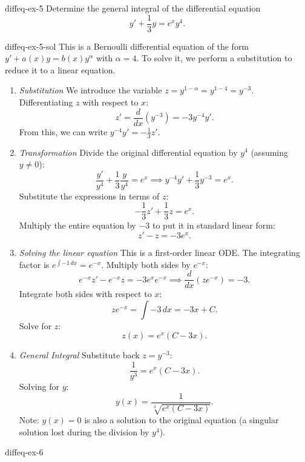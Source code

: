 \documentclass[preview]{standalone}
\begin{document}
\begin{snippetexercise}{diffeq-ex-5}{}
    Determine the general integral of the differential equation
    \[ y' + \frac{1}{3}y = e^x y^4. \]
\end{snippetexercise}

\begin{snippetsolution}{diffeq-ex-5-sol}{}
    This is a Bernoulli differential equation of the form \( y' + a(x)y = b(x)y^\alpha \) with \( \alpha = 4 \). To solve it, we perform a substitution to reduce it to a linear equation.
    \begin{enumerate}
        \item \emph{Substitution}
        We introduce the variable \( z = y^{1-\alpha} = y^{1-4} = y^{-3} \).
        Differentiating \( z \) with respect to \( x \):
        \[ z' = \frac{d}{dx}(y^{-3}) = -3y^{-4}y'. \]
        From this, we can write \( y^{-4}y' = -\frac{1}{3}z' \).
        \item \emph{Transformation}
        Divide the original differential equation by \( y^4 \) (assuming \( y \neq 0 \)):
        \[ \frac{y'}{y^4} + \frac{1}{3}\frac{y}{y^4} = e^x \implies y^{-4}y' + \frac{1}{3}y^{-3} = e^x. \]
        Substitute the expressions in terms of \( z \):
        \[ -\frac{1}{3}z' + \frac{1}{3}z = e^x. \]
        Multiply the entire equation by \( -3 \) to put it in standard linear form:
        \[ z' - z = -3e^x. \]
        \item \emph{Solving the linear equation}
        This is a first-order linear ODE. The integrating factor is \( e^{\int -1 \, dx} = e^{-x} \).
        Multiply both sides by \( e^{-x} \):
        \[ e^{-x}z' - e^{-x}z = -3e^x e^{-x} \implies \frac{d}{dx}(z e^{-x}) = -3. \]
        Integrate both sides with respect to \( x \):
        \[ z e^{-x} = \int -3 \, dx = -3x + C. \]
        Solve for \( z \):
        \[ z(x) = e^x(C - 3x). \]
        \item \emph{General Integral}
        Substitute back \( z = y^{-3} \):
        \[ \frac{1}{y^3} = e^x(C - 3x). \]
        Solving for \( y \):
        \[ y(x) = \frac{1}{\sqrt[3]{e^x(C - 3x)}}. \]
        Note: \( y(x) = 0 \) is also a solution to the original equation (a singular solution lost during the division by \( y^4 \)).
    \end{enumerate}
\end{snippetsolution}

\begin{snippetexercise}{diffeq-ex-6}{}
    \todo
\end{snippetexercise}
\end{document}
